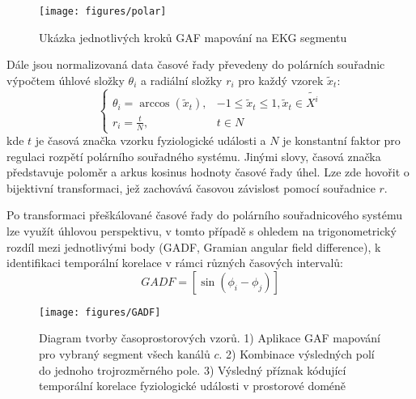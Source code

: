 \begin{figure}[!htb]
    \begin{center}
        \texttt{[image: figures/polar]}
        \caption{Ukázka jednotlivých kroků \gls{GAF} mapování na EKG segmentu}
        \label{fig:polar}
    \end{center}
\end{figure}

Dále jsou normalizovaná data časové řady převedeny do polárních souřadnic
výpočtem úhlové složky $\theta_i$ a radiální složky $r_i$ pro každý vzorek
$\tilde{x}_t$:
\begin{equation}
    \begin{cases}
        \theta_i = \arccos(\tilde{x}_t), & -1 \leq \tilde{x}_t \leq 1, \tilde{x}_t \in \tilde{X^i} \\
        r_i = \frac{t}{N},               & t \in N
    \end{cases}
\end{equation}
kde $t$ je časová značka vzorku fyziologické události a $N$ je konstantní faktor
pro regulaci rozpětí polárního souřadného systému. Jinými slovy, časová značka
představuje poloměr a arkus kosinus hodnoty časové řady úhel. Lze zde hovořit o
bijektivní transformaci, jež zachovává časovou závislost pomocí souřadnice $r$.

Po transformaci přeškálované časové řady do polárního souřadnicového systému lze
využít úhlovou perspektivu, v tomto případě s ohledem na trigonometrický rozdíl
mezi jednotlivými body (\gls{GADF}, Gramian angular field difference), k
identifikaci temporální korelace v rámci různých časových intervalů:
\begin{equation}
    GADF = \left[\sin \left(\phi_i-\phi_j\right)\right]
\end{equation}

\begin{figure}[!htb]
    \begin{center}
        \texttt{[image: figures/GADF]}
        \caption{Diagram tvorby časoprostorových vzorů. 1) Aplikace GAF mapování
            pro vybraný segment všech kanálů $c$. 2) Kombinace výsledných polí
            do jednoho trojrozměrného pole. 3) Výsledný příznak kódující
            temporální korelace fyziologické události v prostorové doméně}
        \label{fig:gadf}
    \end{center}
\end{figure}

